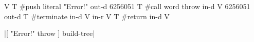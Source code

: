 \centering

  \begin{factorcode}
    V{
        T{ #push { literal "Error!" } { out-d { 6256051 } } }
        T{ #call
            { word throw }
            { in-d V{ 6256051 } }
            { out-d { } }
        }
        T{ #terminate { in-d V{ } } { in-r V{ } } }
        T{ #return { in-d V{ } } }
    }
  \end{factorcode}

\caption{\factor|[ "Error!" throw ] build-tree|}
